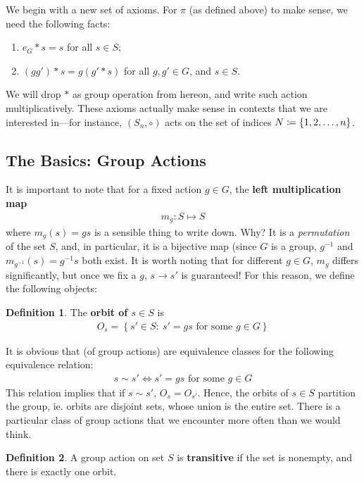 \documentclass[11pt]{amsart} %
\theoremstyle{definition}
\newtheorem{definition}{Definition}[section]
\theoremstyle{definition}
\numberwithin{equation}{section}
\newcommand{\condset}[4]{\left\{ #1  : \: #2 #3 #4 \right\}}
\begin{document}
We begin with a new set of axioms. For $\pi$ (as defined above) to make sense, we need the following facts:
\begin{enumerate}
	\item $e_G \ast s = s$ for all $s \in S$;
	\item $(g g') \ast s = g(g'\ast s)$ for all $g,g' \in G$, and $s \in S$.
\end{enumerate}
We will drop $\ast$ as group operation from hereon, and write such action multiplicatively. These axioms actually make sense in contexts that we are interested in---for instance, $(S_n,\circ)$ acts on the set of indices $N \coloneqq \set{1,2,\dots,n}$.


\subsection{The Basics: Group Actions}

It is important to note that for a fixed action $g \in G$, the \textbf{left multiplication map}
\begin{align*}
m_g : S \mapsto S
\end{align*}
where $m_g (s) = gs$ is a sensible thing to write down. Why? It is a \textit{permutation} of the set $S$, and, in particular, it is a bijective map (since $G$ is a group, $g^{-1}$ and $m_{g^{-1}} (s) = g^{-1} s$ both exist. It is worth noting that for different $g \in G$, $m_g$ differs significantly, but once we fix a $g$, $s \to s'$ is guaranteed! For this reason, we define the following objects:

\begin{definition}
	\label{deforbits}
	The \textbf{orbit of $s \in S$} is 
	\begin{align*}
	O_s = \condset{s' \in S}{s'=gs}{ \text{ for some }}{g \in G}
	\end{align*}
\end{definition}

It is obvious that  (of group actions) are equivalence classes for the following equivalence relation:
\begin{align*}
s \sim s' \iff s'=gs \text{ for some } g \in G
\end{align*}
This relation implies that if $s \sim s'$, $O_s = O_{s'}$. Hence, the orbits of $s \in S$ partition the group, ie. orbits are disjoint sets, whose union is the entire set. There is a particular class of group actions that we encounter more often than we would think.

\begin{definition}
	\label{deftransitiveaction}
	A group action on set $S$ is \textbf{transitive} if the set is nonempty, and there is exactly one orbit.
\end{definition}
\end{document}
